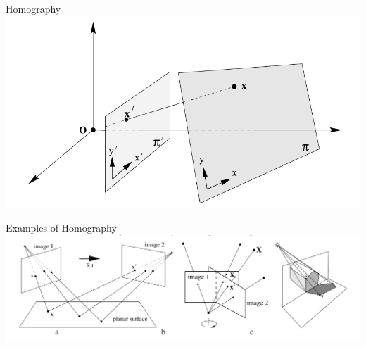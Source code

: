 \documentclass[times,t]{beamer}
\begin{document}
\begin{frame}{Homography}
  \includegraphics[width=\linewidth]{media/homography-maps-a-line-to-a-line.png}
\end{frame}

\begin{frame}{Examples  of  Homography}
  \includegraphics[width=\linewidth]{media/examples-of-homography.png}
\end{frame}
\end{document}
